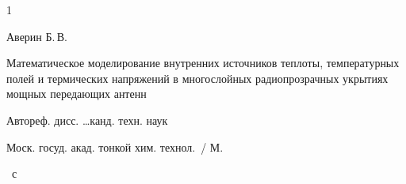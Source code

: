 \begin{thebibliography}{1}


\by Аверин Б.\,В.

\book Математическое моделирование внутренних источников теплоты, температурных полей и термических напряжений в многослойных радиопрозрачных укрытиях мощных передающих антенн

\bookinfo Автореф. дисс. \dots канд. техн. наук

\publ Моск. госуд. акад. тонкой хим. технол.~/ М.


~с



\end{thebibliography}



\makeengtitlem





% 

